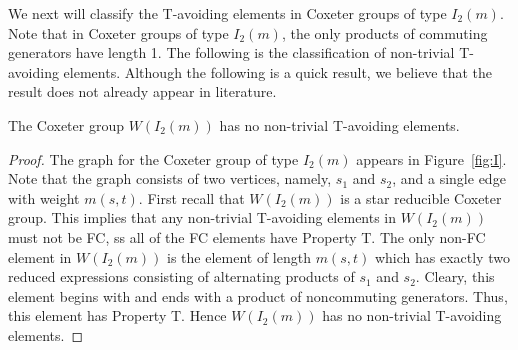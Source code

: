 We next will classify the T-avoiding elements in Coxeter groups of type $I_2(m)$. Note that in Coxeter groups of type $I_2(m)$, the only products of commuting generators have length 1. The following is the classification of non-trivial T-avoiding elements. Although the following is a quick result, we believe that the result does not already appear in literature.
\begin{theorem}
The Coxeter group $W(I_2(m))$ has no non-trivial T-avoiding elements.
\begin{proof}
	The graph for the Coxeter group of type $I_2(m)$ appears in Figure~\ref{fig:I}. Note that the graph consists of two vertices, namely, $s_1$ and $s_2$, and a single edge with weight $m(s,t)$. First recall that $W(I_2(m))$ is a star reducible Coxeter group. This implies that any non-trivial T-avoiding elements in $W(I_2(m))$ must not be FC, ss all of the FC elements have Property T. The only non-FC element in $W(I_2(m))$ is the element of length $m(s,t)$ which has exactly two reduced expressions consisting of alternating products of $s_1$ and $s_2$. Cleary, this element begins with and ends with a product of noncommuting generators. Thus, this element has Property T. Hence $W(I_2(m))$ has no non-trivial T-avoiding elements. 
\end{proof}	
\end{theorem}
 



